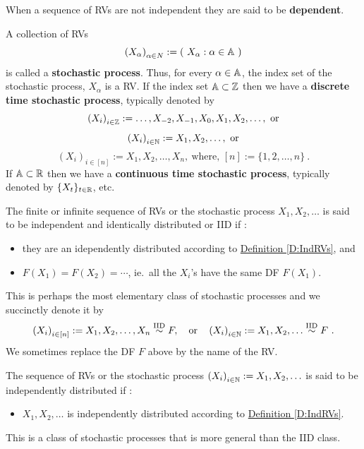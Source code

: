 When a sequence of RVs are not independent they are said to be {\bf dependent}.  

\begin{definition}
A collection of RVs  \[
\left(X_{\alpha} \right)_{\alpha \in N} := \left( \  X_{\alpha} : \alpha \in \mathbb{A} \  \right)
\]
is called a {\bf stochastic process}.  Thus, for every $\alpha \in  \mathbb{A}$, the index set of the stochastic process, $X_{\alpha}$ is a RV.  If the index set $ \mathbb{A}  \subset \mathbb{Z}$ then we have  a {\bf discrete time stochastic process}, typically denoted by 
\[
\left(X_i\right)_{i \in \mathbb{Z}} := \ldots, X_{-2},X_{-1},X_0, X_1,X_2,\ldots , \  \text{or}
\]
\[
\left( X_i \right)_{i \in \mathbb{N}} := X_1,X_2,\ldots , \  \text{or}
\]
\[
\left( X_i \right)_{i \in [n]} := X_1,X_2,\ldots , X_n , \ \text{where, } [n]:= \{1,2,\ldots,n\} \ .
\]
If $\mathbb{A} \subset \mathbb{R}$ then we have a {\bf continuous time stochastic process}, typically denoted by $\{X_t\}_{t \in \mathbb{R}}$, etc.  
\end{definition}

\begin{definition}
The finite or infinite sequence of RVs or the stochastic process $X_1, X_2,\ldots$ is said to be independent and identically distributed or IID if :
\begin{itemize}
\item they are an idependently distributed according to \hyperref[D:IndRVs]{Definition \ref*{D:IndRVs}}, and
\item $F(X_1) = F(X_2) = \cdots $, ie.~all the $X_i$'s have the same DF $F(X_1)$.
\end{itemize}
This is perhaps the most elementary class of stochastic processes and we succinctly denote it by
\[
\left(X_i\right)_{i \in [n]} := X_1, X_2,\ldots, X_n \overset{{\rm IID}}{\sim} F, \quad \text{or} \quad \left(X_i\right)_{i \in \mathbb{N}} := X_1, X_2,\ldots  \overset{{\rm IID}}{\sim} F \ .
\]
We sometimes replace the DF $F$ above by the name of the RV.
 \end{definition}
 
\begin{definition}
The sequence of RVs or the stochastic process $\left(X_i\right)_{i \in \mathbb{N}} := X_1, X_2,\ldots$ is said to be independently distributed if :
\begin{itemize}
\item $X_1, X_2,\ldots$ is independently distributed according to \hyperref[D:IndRVs]{Definition \ref*{D:IndRVs}}.
\end{itemize}
This is a class of stochastic processes that is more general than the IID class.
\end{definition}


